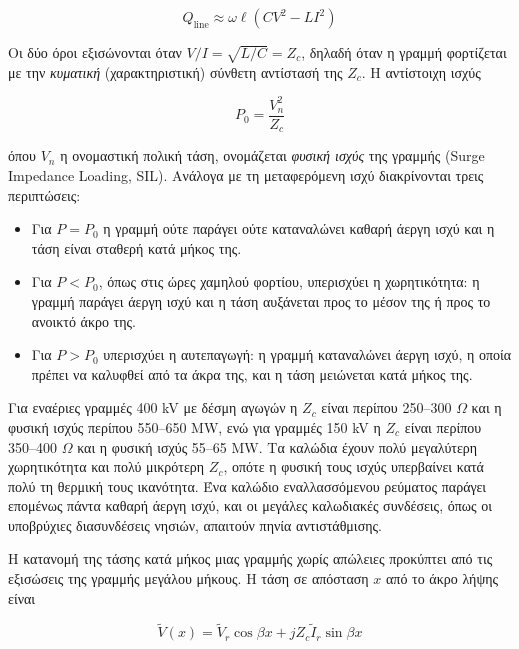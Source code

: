 \begin{equation}
Q_{\mathrm{line}} \approx \omega \ell \left( C V^2 - L I^2 \right)
\label{eq:qline}
\end{equation}

Οι δύο όροι εξισώνονται όταν $V/I = \sqrt{L/C} = Z_c$, δηλαδή όταν η γραμμή φορτίζεται με την
\emph{κυματική} (χαρακτηριστική) σύνθετη αντίστασή της $Z_c$. Η αντίστοιχη ισχύς

\begin{equation}
P_0 = \frac{V_n^2}{Z_c}
\label{eq:sil}
\end{equation}

όπου $V_n$ η ονομαστική πολική τάση, ονομάζεται \emph{φυσική ισχύς} της γραμμής (Surge
Impedance Loading, SIL). Ανάλογα με τη μεταφερόμενη ισχύ διακρίνονται τρεις περιπτώσεις:

\begin{itemize}
\item Για $P = P_0$ η γραμμή ούτε παράγει ούτε καταναλώνει καθαρή άεργη ισχύ και η τάση είναι
      σταθερή κατά μήκος της.
\item Για $P < P_0$, όπως στις ώρες χαμηλού φορτίου, υπερισχύει η χωρητικότητα: η γραμμή
      παράγει άεργη ισχύ και η τάση αυξάνεται προς το μέσον της ή προς το ανοικτό άκρο της.
\item Για $P > P_0$ υπερισχύει η αυτεπαγωγή: η γραμμή καταναλώνει άεργη ισχύ, η οποία πρέπει
      να καλυφθεί από τα άκρα της, και η τάση μειώνεται κατά μήκος της.
\end{itemize}

Για εναέριες γραμμές 400 kV με δέσμη αγωγών η $Z_c$ είναι περίπου 250--300 $\Omega$ και η
φυσική ισχύς περίπου 550--650 MW, ενώ για γραμμές 150 kV η $Z_c$ είναι περίπου 350--400
$\Omega$ και η φυσική ισχύς 55--65 MW. Τα καλώδια έχουν πολύ μεγαλύτερη χωρητικότητα και πολύ
μικρότερη $Z_c$, οπότε η φυσική τους ισχύς υπερβαίνει κατά πολύ τη θερμική τους ικανότητα.
Ένα καλώδιο εναλλασσόμενου ρεύματος παράγει επομένως πάντα καθαρή άεργη ισχύ, και οι μεγάλες
καλωδιακές συνδέσεις, όπως οι υποβρύχιες διασυνδέσεις νησιών, απαιτούν πηνία αντιστάθμισης.

Η κατανομή της τάσης κατά μήκος μιας γραμμής χωρίς απώλειες προκύπτει από τις εξισώσεις της
γραμμής μεγάλου μήκους. Η τάση σε απόσταση $x$ από το άκρο λήψης είναι

\begin{equation}
\tilde{V}(x) = \tilde{V}_r \cos\beta x + j Z_c \tilde{I}_r \sin\beta x
\label{eq:longline}
\end{equation}

